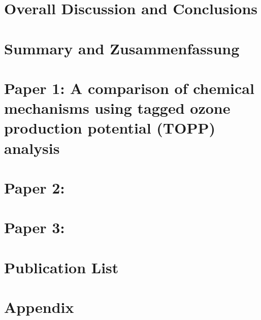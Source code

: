 \documentclass[12pt,twoside,openright,a4paper]{report}
\begin{document}
\chapter{Overall Discussion and Conclusions} \label{s:conclusions}
\clearpage{\pagestyle{empty}\cleardoublepage}

\chapter{Summary and Zusammenfassung} \label{s:summary}
\clearpage{\pagestyle{empty}\cleardoublepage}


 
\clearpage{\pagestyle{empty}\cleardoublepage}

\chapter{Paper 1: A comparison of chemical mechanisms using tagged ozone production potential (TOPP) analysis}
\clearpage{\pagestyle{empty}\cleardoublepage}


\chapter{Paper 2: }
\clearpage{\pagestyle{empty}\cleardoublepage}

\chapter{Paper 3: }
\clearpage{\pagestyle{empty}\cleardoublepage}

\chapter{Publication List}
\clearpage{\pagestyle{empty}\cleardoublepage}

\chapter*{Appendix}
\clearpage{\pagestyle{empty}\cleardoublepage}
\end{document}
